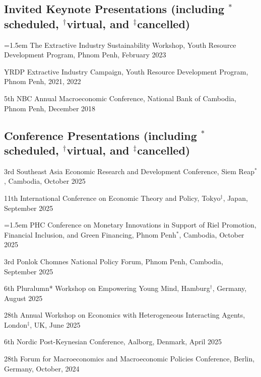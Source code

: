 \documentclass[10pt,a4paper]{article}
\begin{document}
	
\subsection*{Invited Keynote Presentations (including $^\ast$scheduled, $^\dag$virtual, and $^\ddag$cancelled)}

\hangindent=1.5em
The Extractive Industry Sustainability Workshop, Youth Resource Development Program, Phnom Penh, February 2023

YRDP Extractive Industry Campaign, Youth Resource Development Program, Phnom Penh, 2021, 2022

5th NBC Annual Macroeconomic Conference, National Bank of Cambodia, Phnom Penh, December 2018


\subsection*{Conference Presentations (including $^\ast$scheduled, $^\dag$virtual, and $^\ddag$cancelled)}

3rd Southeast Asia Economic Research and Development Conference, Siem Reap$^\ast$, Cambodia, October 2025

11th International Conference on Economic Theory and Policy, Tokyo$^\ddag$, Japan, September 2025

\hangindent=1.5em
PHC Conference on Monetary Innovations in Support of Riel Promotion, Financial Inclusion, and Green Financing, Phnom Penh$^\ast$, Cambodia, October 2025

3rd Ponlok Chomnes National Policy Forum, Phnom Penh, Cambodia, September 2025

6th Pluralumn* Workshop on Empowering Young Mind, Hamburg$^\dag$, Germany, August 2025
 
28th Annual Workshop on Economics with Heterogeneous Interacting Agents, London$^\ddag$, UK, June 2025

6th Nordic Post-Keynesian Conference, Aalborg, Denmark, April 2025

28th Forum for Macroeconomics and Macroeconomic Policies Conference, Berlin, Germany, October, 2024
\end{document}
